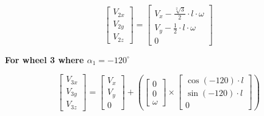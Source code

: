 \documentclass[answers]{exam}
\begin{document}
\begin{questions}
\begin{parts}
\begin{solution}
            \begin{equation} \label{eq:2}
                \begin{bmatrix}
                    V_{2x} \\
                    V_{2y} \\
                    V_{2z}
                \end{bmatrix}
                = \begin{bmatrix}
                    V_x - \frac{\sqrt[2]{3}}{2} \cdot l \cdot \omega \\
                    V_y - \frac{1}{2} \cdot l \cdot \omega           \\
                    0
                \end{bmatrix}
            \end{equation}

            \textbf{For wheel 3 where $\alpha_1 = - 120^\circ$}

            \begin{equation*}
                \begin{bmatrix}
                    V_{3x} \\
                    V_{3y} \\
                    V_{3z}
                \end{bmatrix}
                = \begin{bmatrix}
                    V_x \\
                    V_y \\
                    0
                \end{bmatrix}
                + \left(\begin{bmatrix}
                    0 \\
                    0 \\
                    \omega
                \end{bmatrix} \times \begin{bmatrix}
                    \cos(- 120) \cdot l \\
                    \sin(- 120) \cdot l \\
                    0
                \end{bmatrix}\right)
            \end{equation*}


\end{solution}
\end{parts}
\end{questions}
\end{document}
